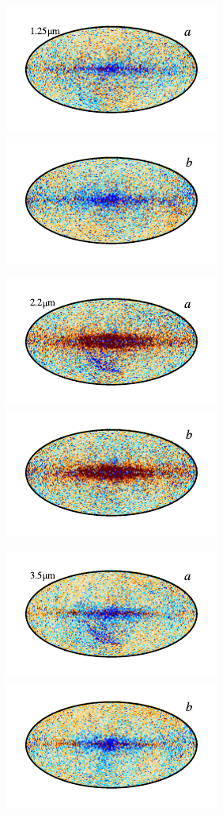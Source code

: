 \documentclass{aa}
\begin{document}
\begin{figure}
	\centering
	\includegraphics{figs/res_maps/res_01a_c0001_000019.pdf}\includegraphics{figs/res_maps/res_01b_c0001_000019.pdf}
  \vspace*{-0.85cm}

	\includegraphics{figs/res_maps/res_02a_c0001_000019.pdf}\includegraphics{figs/res_maps/res_02b_c0001_000019.pdf}
  \vspace*{-0.85cm}

	\includegraphics{figs/res_maps/res_03a_c0001_000019.pdf}\includegraphics{figs/res_maps/res_03b_c0001_000019.pdf}
  \vspace*{-0.85cm}


\end{figure}
\end{document}
